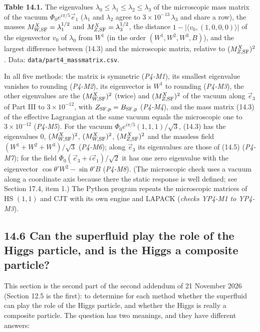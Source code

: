 \documentclass[
  10pt,
]{article}
\begin{document}
\textbf{Table 14.1.} The eigenvalues
\(\lambda_0\le\lambda_1\le\lambda_2\le\lambda_3\) of the microscopic
mass matrix of the vacuum \(\Phi_0e^{i\pi/5}\vec e_1\) (\(\lambda_1\)
and \(\lambda_2\) agree to \(3\times10^{-13}\,\lambda_3\) and share a
row), the masses \(M^X_{W,{\rm SF}}=\lambda_1^{1/2}\) and
\(M^X_{Z,{\rm SF}}=\lambda_3^{1/2}\), the distance
\(1-\lvert\langle v_0,(1,0,0,0)\rangle\rvert\) of the eigenvector
\(v_0\) of \(\lambda_0\) from \(W^1\) (in the order
\((W^1,W^2,W^3,B)\)), and the largest difference between (14.3) and the
microscopic matrix, relative to \((M^X_{Z,{\rm SF}})^2\). Data:
\texttt{data/part4\_massmatrix.csv}.

In all five methods: the matrix is symmetric (\emph{P4-M1}), its
smallest eigenvalue vanishes to rounding (\emph{P4-M2}), its eigenvector
is \(W^1\) to rounding (\emph{P4-M3}), the other eigenvalues are the
\((M^X_{W,{\rm SF}})^2\) (twice) and \((M^X_{Z,{\rm SF}})^2\) of the
vacuum along \(\vec e_3\) of Part III to \(3\times10^{-12}\), with
\(Z_{{\rm SF},p}=B_{{\rm SF},p}\) (\emph{P4-M4}), and the mass matrix
(14.3) of the effective Lagrangian at the same vacuum equals the
microscopic one to \(3\times10^{-12}\) (\emph{P4-M5}). For the vacuum
\(\Phi_0e^{i\pi/5}(1,1,1)/\sqrt3\), (14.3) has the eigenvalues \(0\),
\((M^X_{W,{\rm SF}})^2\), \((M^X_{W,{\rm SF}})^2\),
\((M^X_{Z,{\rm SF}})^2\) and the massless field \((W^1+W^2+W^3)/\sqrt3\)
(\emph{P4-M6}); along \(\vec e_3\) its eigenvalues are those of (14.5)
(\emph{P4-M7}); for the field \(\Phi_0(\vec e_3+i\vec e_1)/\sqrt2\) it
has one zero eigenvalue with the eigenvector
\(\cos\theta'W^2-\sin\theta'B\) (\emph{P4-M8}). (The microscopic check
uses a vacuum along a coordinate axis because there the static response
is well defined; see Section 17.4, item 1.) The Python program repeats
the microscopic matrices of HS \((1,1)\) and CJT with its own engine and
LAPACK (\emph{checks YP4-M1 to YP4-M3}).

\hypertarget{can-the-superfluid-play-the-role-of-the-higgs-particle-and-is-the-higgs-a-composite-particle}{%
\subsection{14.6 Can the superfluid play the role of the Higgs particle,
and is the Higgs a composite
particle?}\label{can-the-superfluid-play-the-role-of-the-higgs-particle-and-is-the-higgs-a-composite-particle}}

This section is the second part of the second addendum of 21 November
2026 (Section 12.5 is the first): to determine for each method whether
the superfluid can play the role of the Higgs particle, and whether the
Higgs is really a composite particle. The question has two meanings, and
they have different answers:
\end{document}

